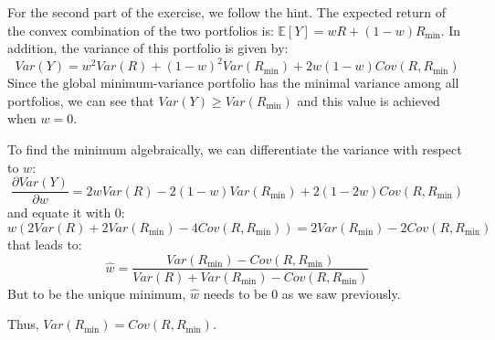 \documentclass[10pt]{article}
\newcommand{\Ebb}{\mathbb{E}}
\newenvironment{exercise}[2][Exercise]{\begin{trivlist}
  \item[\hskip \labelsep {\bfseries #1}\hskip \labelsep {\bfseries #2.}]}{\end{trivlist}}
\begin{document}
\begin{exercise}{2}
  For the second part of the exercise, we follow the hint. The expected return of the convex combination of the two portfolios is: $ \Ebb[Y] = wR + (1-w)R_{\text{min}}$. In addition, the variance of this portfolio is given by:
  $$ Var(Y) = w^2Var(R) + (1-w)^2Var(R_{\text{min}}) + 2w(1-w)Cov(R,R_{\text{min}})$$
  Since the global minimum-variance portfolio has the minimal variance among all portfolios, we can see that $Var(Y) \geq Var(R_{\text{min}})$ and this value is achieved when $w = 0$. 

  To find the minimum algebraically, we can differentiate the variance with respect to $w$: $$ \frac{\partial Var(Y)}{\partial w } = 2wVar(R) - 2(1-w)Var(R_{\text{min}})+2(1-2w)Cov(R,R_{\text{min}})$$ and equate it with $0$:
  $$ w(2Var(R) + 2Var(R_{\text{min}})-4Cov(R,R_{\text{min}})) = 2Var(R_{\text{min}})-2Cov(R,R_{\text{min}})$$ that leads to: 
  $$ \hat{w} = \frac{Var(R_{\text{min}})-Cov(R,R_{\text{min}})}{Var(R)+Var(R_{\text{min}})-Cov(R,R_{\text{min}})}$$
  But to be the unique minimum, $\hat{w}$ needs to be $0$ as we saw previously. 

  Thus, $ Var(R_{\text{min}}) = Cov(R,R_{\text{min}})$.


\end{exercise}

\newpage
\end{document}
